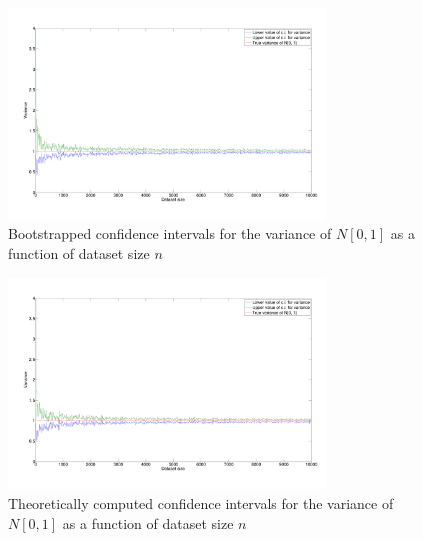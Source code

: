 \documentclass[10pt]{article}
\begin{document}
\begin{figure}
  \centering
  \includegraphics[width=0.75\textwidth]{images/hw1_4_c_norm.pdf}
  \caption{Bootstrapped confidence intervals for the variance of $N[0,1]$ as a function of dataset size $n$}
  \label{fig:norm_n_var}
\end{figure}

\begin{figure}
  \centering
  \includegraphics[width=0.75\textwidth]{images/hw1_4_c_norm_chi.pdf}
  \caption{Theoretically computed confidence intervals for the variance of $N[0,1]$ as a function of dataset size $n$}
  \label{fig:norm_n_var_chi}
\end{figure}

\clearpage
\end{document}
